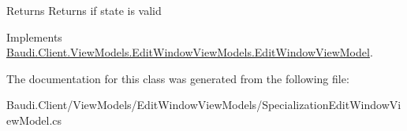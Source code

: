 \begin{DoxyReturn}{Returns}
Returns if state is valid
\end{DoxyReturn}


Implements \hyperlink{class_baudi_1_1_client_1_1_view_models_1_1_edit_window_view_models_1_1_edit_window_view_model_aeae328bfe7608e01ce3c54da0c13f781}{Baudi.\+Client.\+View\+Models.\+Edit\+Window\+View\+Models.\+Edit\+Window\+View\+Model}.



The documentation for this class was generated from the following file\+:\begin{DoxyCompactItemize}
\item 
Baudi.\+Client/\+View\+Models/\+Edit\+Window\+View\+Models/Specialization\+Edit\+Window\+View\+Model.\+cs\end{DoxyCompactItemize}
